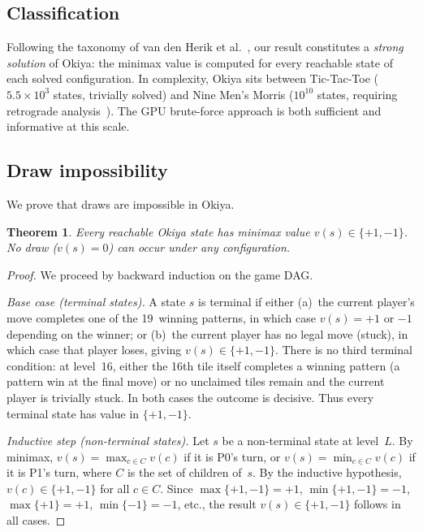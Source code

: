 \documentclass[11pt,a4paper]{article}
\newtheorem{theorem}{Theorem}
\begin{document}
\subsection{Classification}

Following the taxonomy of van den Herik et al.~\cite{vandenherik2002}, our
result constitutes a \emph{strong solution} of Okiya: the minimax value is
computed for every reachable state of each solved configuration.  In
complexity, Okiya sits between Tic-Tac-Toe ($5.5 \times 10^{3}$ states,
trivially solved) and Nine Men's Morris ($10^{10}$ states, requiring
retrograde analysis~\cite{gasser1996}).  The GPU brute-force approach is both
sufficient and informative at this scale.

\subsection{Draw impossibility}\label{sec:nodraw}

We prove that draws are impossible in Okiya.

\begin{theorem}
Every reachable Okiya state has minimax value $v(s) \in \{+1, -1\}$.
No draw ($v(s) = 0$) can occur under any configuration.
\end{theorem}

\begin{proof}
We proceed by backward induction on the game DAG.

\emph{Base case (terminal states).}  A state $s$ is terminal if either
(a)~the current player's move completes one of the 19~winning patterns,
in which case $v(s) = +1$ or $-1$ depending on the winner; or (b)~the
current player has no legal move (stuck), in which case that player
loses, giving $v(s) \in \{+1, -1\}$.  There is no third terminal condition: at level~16, either the
16th tile itself completes a winning pattern (a pattern win at the
final move) or no unclaimed tiles remain and the current player is
trivially stuck.  In both cases the outcome is decisive.
Thus every terminal state has value in $\{+1, -1\}$.

\emph{Inductive step (non-terminal states).}  Let $s$ be a
non-terminal state at level~$L$.  By minimax, $v(s) = \max_{c \in C}
v(c)$ if it is P0's turn, or $v(s) = \min_{c \in C} v(c)$ if it is
P1's turn, where $C$ is the set of children of~$s$.  By the inductive
hypothesis, $v(c) \in \{+1, -1\}$ for all $c \in C$.  Since
$\max\{+1, -1\} = +1$, $\min\{+1, -1\} = -1$, $\max\{+1\} = +1$,
$\min\{-1\} = -1$, etc., the result $v(s) \in \{+1, -1\}$ follows in
all cases.
\end{proof}
\end{document}
